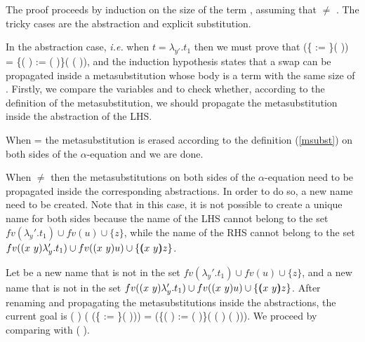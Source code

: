 The proof proceeds by induction on the size of the term , assuming that  \ensuremath{\not=} . The tricky cases are the abstraction and explicit substitution. 
\begin{coqdoccode}
\end{coqdoccode}
In the abstraction case, {\it i.e.} when $t = \lambda_{y'}.t_1$ then we must prove that    (\{ := \}(  )) = \{(   ) := (   )\}(   (  )), and the induction hypothesis states that a swap can be propagated inside a metasubstitution whose body is a term with the same size of . Firstly, we compare the variables  and  to check whether, according to the definition of the metasubstitution, we should propagate the metasubstitution inside the abstraction of the LHS. 
\begin{coqdoccode}
\end{coqdoccode}
When  =  the metasubstitution is erased according to the definition (\ref{msubst}) on both sides of the $\alpha$-equation and we are done.
\begin{coqdoccode}
\end{coqdoccode}
When  \ensuremath{\not=}  then the metasubstitutions on both sides of the $\alpha$-equation need to be propagated inside the corresponding abstractions. In order to do so, a new name need to be created. Note that in this case, it is not possible to create a unique name for both sides because the name of the LHS cannot belong to the set $fv(\lambda_y'.t_1) \cup fv(u) \cup \{z\}$, while the name of the RHS cannot belong to the set $fv((x\ y) \lambda_y'.t_1) \cup fv((x\ y) u) \cup \{(\!\!(x\ y)\!\!) z\}$.
\begin{coqdoccode}
\end{coqdoccode}
Let  be a new name that is not in the set $fv(\lambda_y'.t_1) \cup fv(u) \cup \{z\}$, and  a new name that is not in the set $fv((x\ y) \lambda_y'.t_1) \cup fv((x\ y) u) \cup \{(\!\!(x\ y)\!\!) z\}$. After renaming and propagating the metasubstitutions inside the abstractions, the current goal is  (   ) (   (\{ := \}(   ))) =   (\{(   ) := (   )\}( (   )  (   ))). We proceed by comparing  with (   ).
